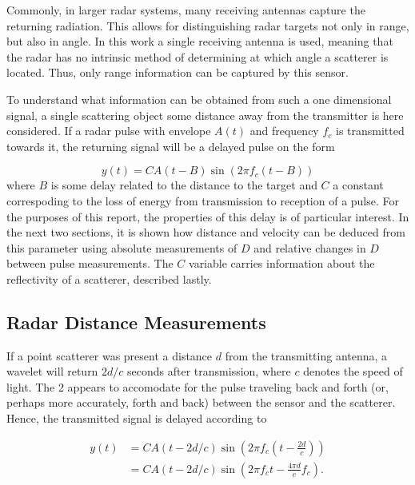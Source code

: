 Commonly, in larger radar systems, many receiving antennas capture the returning radiation. This allows for distinguishing radar targets not only in range, but also in angle. In this work a single receiving antenna is used, meaning that the radar has no intrinsic method of determining at which angle a scatterer is located. Thus, only range information can be captured by this sensor. 

To understand what information can be obtained from such a one dimensional signal, a single scattering object some distance away from the transmitter is here considered. If a radar pulse with envelope $A(t)$ and frequency $f_c$ is transmitted towards it, the returning signal will be a delayed pulse on the form \citep{richards_2014}

\begin{equation}\label{eq:returning}
	y(t) = CA(t-B)\sin(2\pi f_c (t-B))
\end{equation}
where $B$ is some delay related to the distance to the target and $C$ a constant correspoding to the loss of energy from transmission to reception of a pulse. For the purposes of this report, the properties of this delay is of particular interest. In the next two sections, it is shown how distance and velocity can be deduced from this parameter using absolute measurements of $D$ and relative changes in $D$ between pulse measurements. The $C$ variable carries information about the reflectivity of a scatterer, described lastly. 

\subsection{Radar Distance Measurements}

If a point scatterer was present a distance $d$ from the transmitting antenna, a wavelet will return $2d/c$ seconds after transmission, where $c$ denotes the speed of light. The 2 appears to accomodate for the pulse traveling back and forth (or, perhaps more accurately, forth and back) between the sensor and the scatterer. Hence, the transmitted signal is delayed according to 

\begin{equation}
	\begin{split}
		y(t) 
		& = CA(t-2d/c)\sin(2\pi f_c(t - \frac{2d}{c})) \\
		& = CA(t-2d/c)\sin(2\pi f_ct - \frac{4\pi d}{c}f_c).
	\end{split}
\end{equation}

